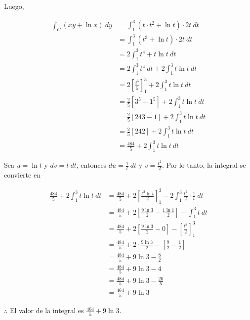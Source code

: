 \documentclass[12pt]{exam}
\begin{document}
\begin{questions}
\begin{enumerate}
    Luego,

    \begin{align*}
      \int_C(xy+\ln{x})~dy
      &= \int_{1}^{3} (t \cdot t^2 + \ln{t}) \cdot 2t~dt\\
      &= \int_{1}^{3} (t^3 + \ln{t}) \cdot 2t~dt\\
      &= 2 \int_{1}^{3} t^4 + t\ln{t}~dt\\
      &= 2 \int_{1}^{3} t^4 ~ dt + 2 \int_{1}^{3} t\ln{t}~dt\\
      &= 2 \left[\frac{t^5}{5}\right]_{1}^{3} + 2 \int_{1}^{3} t\ln{t}~dt\\
      &= \frac{2}{5} \left[3^5 - 1^5\right] + 2 \int_{1}^{3} t\ln{t}~dt\\
      &= \frac{2}{5} \left[243 - 1\right] + 2 \int_{1}^{3} t\ln{t}~dt\\
      &= \frac{2}{5} \left[242\right] + 2 \int_{1}^{3} t\ln{t}~dt\\
      &= \frac{484}{5} + 2 \int_{1}^{3} t\ln{t}~dt
      \end{align*}

    Sea $u = \ln{t}$ y $dv = t~dt$, entonces $du = \frac{1}{t}~dt$ y $v = \frac{t^2}{2}$. Por lo tanto, la integral se convierte en

    \begin{align*}
      \frac{484}{5} + 2 \int_{1}^{3} t\ln{t}~dt
      &= \frac{484}{5} + 2 \left[\frac{t^2\ln{t}}{2}\right]_{1}^{3} - 2 \int_{1}^{3} \frac{t^2}{2} \cdot \frac{1}{t}~dt\\
      &= \frac{484}{5} + 2 \left[\frac{9\ln{3}}{2} - \frac{1\ln{1}}{2}\right] - \int_{1}^{3} t~dt\\
      &= \frac{484}{5} + 2 \left[\frac{9\ln{3}}{2} - 0\right] - \left[\frac{t^2}{2}\right]_{1}^{3}\\
      &= \frac{484}{5} + 2 \cdot \frac{9\ln{3}}{2} - \left[\frac{9}{2} - \frac{1}{2}\right]\\
      &= \frac{484}{5} + 9\ln{3} - \frac{8}{2}\\
      &= \frac{484}{5} + 9\ln{3} - 4\\
      &= \frac{484}{5} + 9\ln{3} - \frac{20}{5}\\
      &= \frac{464}{5} + 9\ln{3}
    \end{align*}

    $\therefore$ El valor de la integral es $\frac{464}{5} + 9\ln{3}$.
      
  \end{enumerate}

\end{questions}

\vskip30pt
\RaggedRight

\newpage



\pagestyle{foot}    %
\end{document}
